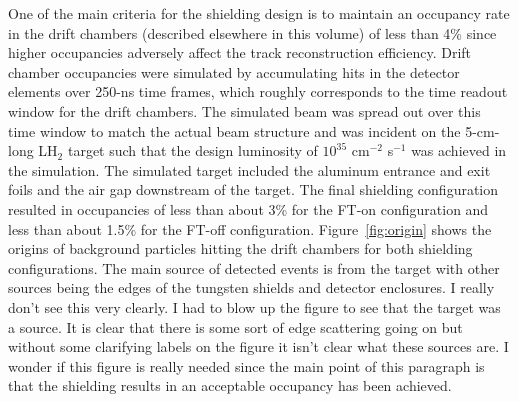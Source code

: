 One of the main criteria for the shielding design is to maintain an occupancy rate in the drift chambers (described elsewhere in this volume)
of less than 4\% since higher occupancies adversely affect the track reconstruction efficiency.  Drift chamber occupancies were simulated 
by accumulating hits in the detector elements over 250-ns time frames, which roughly corresponds to the time readout window for the drift 
chambers. The simulated beam was spread out over this time window to match the actual beam structure and was incident on the 5-cm-long 
LH$_2$ target such that the design luminosity of $10^{35}$ cm$^{-2}$ s$^{-1}$ was achieved in the simulation. The simulated target 
included the aluminum entrance and exit foils and the air gap downstream of the target. The final shielding configuration resulted in 
occupancies of less than about 3\% for the FT-on configuration and less than about 1.5\% for the FT-off configuration.  Figure~\ref{fig:origin} 
shows the origins of background particles hitting the drift chambers for both shielding configurations. The main source of detected events 
is from the target with other sources being the edges of the tungsten shields and detector enclosures. {\color{red} I really don't see this very 
clearly.  I had to blow up the figure to see that the target was a source.  It is clear that there is some sort of edge scattering going on 
but without some clarifying labels on the figure it isn't clear what these sources are.  I wonder if this figure is really needed since the main 
point of this paragraph is that the shielding results in an acceptable occupancy has been achieved.}  


